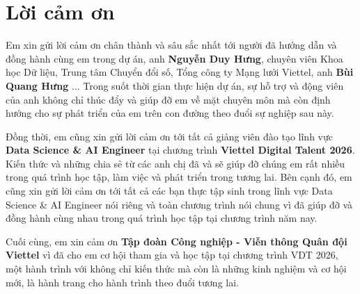 \chapter*{Lời cảm ơn}

Em xin gửi lời cảm ơn chân thành và sâu sắc nhất tới người đã hướng dẫn và đồng hành cùng em trong dự án, anh \textbf{Nguyễn Duy Hưng}, chuyên viên Khoa học Dữ liệu, Trung tâm Chuyển đổi số, Tổng công ty Mạng lưới Viettel, anh \textbf{Bùi Quang Hưng} ... Trong suốt thời gian thực hiện dự án, sự hỗ trợ và động viên của anh không chỉ thúc đẩy và giúp đỡ em về mặt chuyên môn mà còn định hướng cho sự phát triển của em trên con đường theo đuổi sự nghiệp sau này.

Đồng thời, em cũng xin gửi lời cảm ơn tới tất cả giảng viên đào tạo lĩnh vực \textbf{Data Science \& AI Engineer} tại chương trình \textbf{Viettel Digital Talent 2026}. Kiến thức và những chia sẻ từ các anh chị đã và sẽ giúp đỡ chúng em rất nhiều trong quá trình học tập, làm việc và phát triển trong tương lai. Bên cạnh đó, em cũng xin gửi lời cảm ơn tới tất cả các bạn thực tập sinh trong lĩnh vực Data Science \& AI Engineer nói riêng và toàn chương trình nói chung vì đã giúp đỡ và đồng hành cùng nhau trong quá trình học tập tại chương trình năm nay.

Cuối cùng, em xin cảm ơn \textbf{Tập đoàn Công nghiệp - Viễn thông Quân đội Viettel} vì đã cho em cơ hội tham gia và học tập tại chương trình VDT 2026, một hành trình với không chỉ kiến thức mà còn là những kinh nghiệm và cơ hội mới, là hành trang cho hành trình theo đuổi tương lai.
